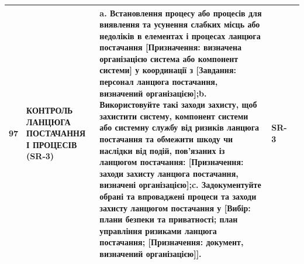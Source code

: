 \documentclass[10pt]{article}
\begin{document}
\begin{longtable}{|c|>{\raggedright\arraybackslash}p{4cm}|>{\raggedright\arraybackslash}p{6cm}|>{\raggedright\arraybackslash}p{1.5cm}|>{\raggedright\arraybackslash}p{3.5cm}|}
97 & КОНТРОЛЬ ЛАНЦЮГА ПОСТАЧАННЯ І ПРОЦЕСІВ (SR-3) & a. Встановлення процесу або процесів для виявлення та усунення слабких місць або недоліків в елементах і процесах ланцюга постачання [Призначення: визначена організацією система або компонент системи] у координації з [Завдання: персонал ланцюга постачання, визначений організацією];\newline b. Використовуйте такі заходи захисту, щоб захистити систему, компонент системи або системну службу від ризиків ланцюга постачання та обмежити шкоду чи наслідки від подій, пов'язаних із ланцюгом постачання: [Призначення: заходи захисту ланцюга постачання, визначені організацією];\newline c. Задокументуйте обрані та впроваджені процеси та заходи захисту ланцюгом постачання у [Вибір: плани безпеки та приватності; план управління ризиками ланцюга постачання; [Призначення: документ, визначений організацією]]. & SR-3 & \\ \hline


\end{longtable}
\end{document}
